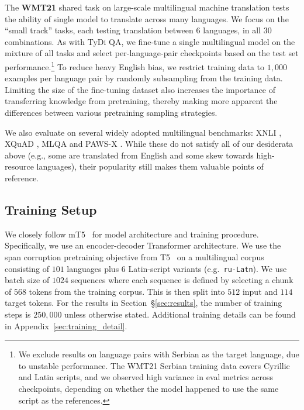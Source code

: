 \documentclass{article} %
\begin{document}
The \textbf{WMT21} shared task on large-scale multilingual machine translation \citep{wenzek-etal-2021-findings} tests the ability of single model to translate across many languages.  We focus on the ``small track'' tasks, each testing translation between $6$ languages, in all $30$ combinations.  As with TyDi QA, we fine-tune a single multilingual model on the mixture of all tasks and select per-language-pair checkpoints based on the test set performance.\footnote{We exclude results on language pairs with Serbian as the target language, due to unstable performance. The WMT21 Serbian training data covers Cyrillic and Latin scripts, and we observed high variance in eval metrics across checkpoints, depending on whether the model happened to use the same script as the references.} To reduce heavy English bias, we restrict training data to $1{,}000$ examples per language pair by randomly subsampling from the training data.  Limiting the size of the fine-tuning dataset also increases the importance of transferring knowledge from pretraining, thereby making more apparent the differences between various pretraining sampling strategies.

We also evaluate on several widely adopted multilingual benchmarks: XNLI \citep{conneau-etal-2018-xnli}, XQuAD \citep{artetxe-etal-2020-cross}, MLQA \citep{lewis-etal-2020-mlqa} and PAWS-X \citep{yang-etal-2019-paws}. While these do not satisfy all of our desiderata above (e.g., some are translated from English and some skew towards high-resource languages), their popularity still makes them valuable points of reference.


\subsection{Training Setup}

We closely follow mT5~\citep{xue-etal-2021-mt5} for model architecture and training procedure. Specifically, we use an encoder-decoder Transformer architecture. We use the span corruption pretraining objective from T5~\citep{raffel_t5} on a multilingual corpus consisting of $101$ languages plus $6$ Latin-script variants (e.g.~\texttt{ru-Latn}). We use batch size of $1024$ sequences where each sequence is defined by selecting a chunk of $568$ tokens from the training corpus. This is then split into $512$ input and $114$ target tokens. For the results in Section~\S\ref{sec:results}, the number of training steps is $250{,}000$ unless otherwise stated. Additional training details can be found in Appendix~\ref{sec:training_detail}.
\end{document}
